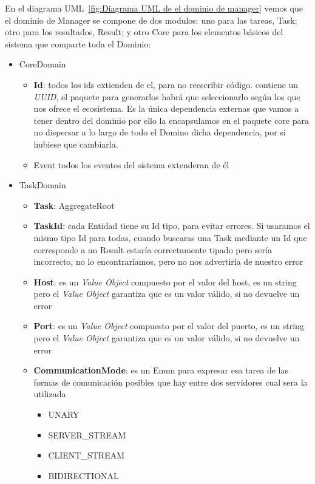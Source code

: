 En el diagrama UML~\cref{fig:Diagrama UML de el dominio de manager} vemos que el dominio de Manager se compone de dos modulos: uno para las tareas, Task; otro para los resultados, Result; y otro Core para los elementos básicos del sistema que comparte toda el Dominio:
\begin{itemize}
    \item CoreDomain
        \begin{itemize}
            \item \textbf{Id}: todos los ids extienden de el, para no reescribir código. contiene un \textit{UUID}, el paquete para generarlos habrá que seleccionarlo según los que nos ofrece el ecosistema. Es la única dependencia externas que vamos a tener dentro del dominio por ello la encapsulamos en el paquete core para no dispersar a lo largo de todo el Domino dicha dependencia, por si hubiese que cambiarla.
            \item Event todos los eventos del sistema extenderan de él
        \end{itemize}
    \item TaskDomain
        \begin{itemize}
        \item \textbf{Task}: AggregateRoot
        \item \textbf{TaskId}: cada Entidad tiene su Id tipo, para evitar errores. Si usaramos el mismo tipo Id para todas, cuando buscaras una Task mediante un Id que corresponde a un Result estaría correctamente tipado pero sería incorrecto, no lo encontraríamos, pero no nos advertiría de nuestro error
        \item \textbf{Host}: es un \textit{Value Object} compuesto por el valor del host, es un string pero el \textit{Value Object} garantiza que es un valor válido, si no devuelve un error
        \item \textbf{Port}: es un \textit{Value Object} compuesto por el valor del puerto, es un string pero el \textit{Value Object} garantiza que es un valor válido, si no devuelve un error
        \item \textbf{CommunicationMode}: es un Enum para expresar esa tarea de las formas de comunicación posibles que hay entre dos servidores cual sera la utilizada
            \begin{itemize}
                \item UNARY
                \item SERVER\_STREAM
                \item CLIENT\_STREAM
                \item BIDIRECTIONAL

\end{itemize}
\end{itemize}
\end{itemize}
